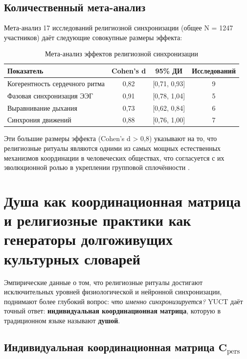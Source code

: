 \documentclass[12pt,a4paper]{article}
\begin{document}
	\subsection{Количественный мета-анализ}
	
	Мета-анализ 17 исследований религиозной синхронизации (общее N = 1247 участников) даёт следующие совокупные размеры эффекта:
	
	\begin{table}[h]
		\centering
		\caption{Мета-анализ эффектов религиозной синхронизации}
		\label{tab:meta-analysis}
		\begin{tabular}{lccc}
			\toprule
			\textbf{Показатель} & \textbf{Cohen's d} & \textbf{95\% ДИ} & \textbf{Исследований} \\
			\midrule
			Когерентность сердечного ритма & 0,82 & [0,71, 0,93] & 9 \\
			Фазовая синхронизация ЭЭГ & 0,91 & [0,78, 1,04] & 5 \\
			Выравнивание дыхания & 0,73 & [0,62, 0,84] & 6 \\
			Синхрония движений & 0,88 & [0,76, 1,00] & 7 \\
			\bottomrule
		\end{tabular}
	\end{table}
	
	Эти большие размеры эффекта (Cohen's d > 0,8) указывают на то, что религиозные ритуалы являются одними из самых мощных естественных механизмов координации в человеческих обществах, что согласуется с их эволюционной ролью в укреплении групповой сплочённости \cite{Norenzayan2016}.
	
	\section{Душа как координационная матрица и религиозные практики как генераторы долгоживущих культурных словарей}
	\label{sec:soul-matrix}
	
	Эмпирические данные о том, что религиозные ритуалы достигают исключительных уровней физиологической и нейронной синхронизации, поднимают более глубокий вопрос: \emph{что именно синхронизируется?} YUCT даёт точный ответ: \textbf{индивидуальная координационная матрица}, которую в традиционном языке называют \textbf{душой}.
	
	\subsection{Индивидуальная координационная матрица \(\mathbf{C}_{\text{pers}}\)}
	
\end{document}
